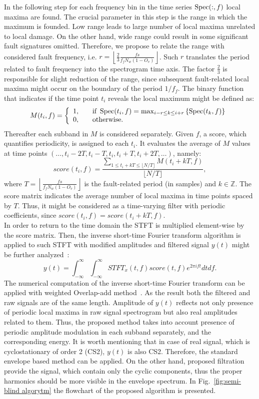 In the following step for each frequency bin in the time series $\operatorname{Spec}(:,f)$ local maxima are found. The crucial parameter in this step is the range in which the maximum is founded. Low range leads to large number of local maxima unrelated to local damage. On the other hand, wide range could result in some significant fault signatures omitted. Therefore, we propose to relate the range with considered fault frequency, i.e. $r=\left\lfloor \frac{2}{3}\frac{fs}{f_f N_w(1-O_v)}\right\rfloor$. Such $r$ translates the period related to fault frequency into the spectrogram time axis. The factor $\frac{2}{3}$ is responsible for slight reduction of the range, since subsequent fault-related local maxima might occur on the boundary of the period $1/f_f$. The binary function that indicates if the time point $t_i$ reveals the local maximum might be defined as:
\begin{displaymath}
M(t_i,f)= \left\{ \begin{array}{ll}
1, & \quad \text{if } \operatorname{Spec}(t_i,f)=\max_{i-r\leq k \leq i+r}\left\{\operatorname{Spec}(t_k,f)\right\} 
\\ 
0, & \quad \text{otherwise.}
\end{array}
\right.
\end{displaymath}
Thereafter each subband in $M$ is considered separately. Given $f$, a score, which quantifies periodicity, is assigned to each $t_i$. It evaluates the average of $M$ values at time points $(\ldots,t_{i}-2T,t_{i}-T,t_i,t_{i}+T,t_{i}+2T,\ldots)$, namely: 
$$
score(t_i,f)=\frac{\sum_{1 \leq t_i + kT \leq \lfloor N/T\rfloor}M(t_i+kT,f)}{\lfloor N/T\rfloor},
$$
where $T=\left\lfloor \frac{fs}{f_f N_w(1-O_v)}\right\rfloor$ is the fault-related period (in samples) and $k\in \mathbb{Z}$. The score matrix indicates the average number of local maxima in time points spaced by $T$. Thus, it might be considered as a time-varying filter with periodic coefficients, since $score(t_i,f)=score(t_i + kT,f)$.\\
In order to return to the time domain the STFT is multiplied element-wise by the score matrix. Then, the inverse short-time Fourier transform algorithm is applied to such STFT with modified amplitudes and filtered signal $y(t)$ might be further analyzed~\cite{boashash2015time}:
$$
y(t)=\int_{-\infty}^\infty\int_{-\infty}^\infty STFT_x(t,f)score(t,f)e^{2\pi i ft}dt df.
$$
%
The numerical computation of the inverse short-time Fourier transform can be applied with weighted Overlap-add method~\cite{dutoit2010applied}. As the result both the filtered and raw signals are of the same length. Amplitude of $y(t)$ reflects not only presence of periodic local maxima in raw signal spectrogram but also real amplitudes related to them. Thus, the proposed method takes into account presence of periodic amplitude modulation in each subband separately, and the corresponding energy. It is worth mentioning that in case of real signal, which is cyclostationary of order 2 (CS2), $y(t)$ is also CS2. Therefore, the standard envelope based method can be applied. On the other hand, proposed filtration provide the signal, which contain only the cyclic components, thus the proper harmonics should be more visible in the envelope spectrum. In Fig.~\ref{fig:semi-blind algorytm} the flowchart of the proposed algorithm is presented. 

